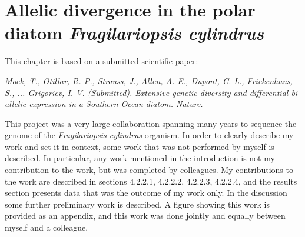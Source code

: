 \chapter{Allelic divergence in the polar diatom \textit{Fragilariopsis cylindrus}}
\label{chap:diatom}

This chapter is based on a submitted scientific paper:

\vspace{5mm}

\textit{Mock, T., Otillar, R. P., Strauss, J., Allen, A. E., Dupont, C. L., Frickenhaus, S., ... Grigoriev, I. V. (Submitted). Extensive genetic diversity and differential bi-allelic expression in a Southern Ocean diatom. Nature.}

\vspace{5mm}

This project was a very large collaboration spanning many years to sequence the genome of the \textit{Fragilariopsis cylindrus} organism.
In order to clearly describe my work and set it in context, some work that was not performed by myself is described.
In particular, any work mentioned in the introduction is not my contribution to the work, but was completed by colleagues.
My contributions to the work are described in sections 4.2.2.1, 4.2.2.2, 4.2.2.3, 4.2.2.4, and the results section presents data that was the outcome of my work only.
In the discussion some further preliminary work is described. A figure showing this work is provided as an appendix, and this work was done jointly and equally between myself and a colleague.

\newpage




